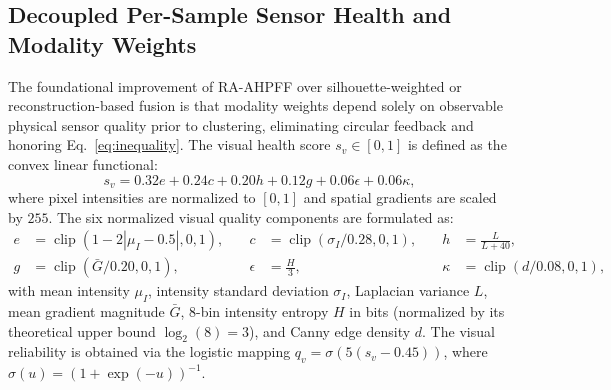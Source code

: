 \documentclass[11pt, a4paper]{article}
\begin{document}
\subsection{Decoupled Per-Sample Sensor Health and Modality Weights}
\label{subsec:weights}
The foundational improvement of RA-AHPFF over silhouette-weighted or reconstruction-based fusion \cite{hu2022view, yang2025deep, he2026adaptive} is that modality weights depend solely on observable physical sensor quality prior to clustering, eliminating circular feedback \cite{kim2022profeat} and honoring Eq.~\eqref{eq:inequality}. The visual health score $s_v \in [0,1]$ is defined as the convex linear functional:
\begin{equation}
s_v = 0.32 e + 0.24 c + 0.20 h + 0.12 g + 0.06 \epsilon + 0.06 \kappa,
\label{eq:sv}
\end{equation}
where pixel intensities are normalized to $[0,1]$ and spatial gradients are scaled by $255$. The six normalized visual quality components are formulated as:
\begin{equation}
\begin{aligned}
e &= \operatorname{clip}(1-2|\mu_I-0.5|,0,1), \quad &
c &= \operatorname{clip}(\sigma_I/0.28,0,1), \quad &
h &= \frac{L}{L+40}, \\
g &= \operatorname{clip}(\bar{G}/0.20,0,1), \quad &
\epsilon &= \frac{H}{3}, \quad &
\kappa &= \operatorname{clip}(d/0.08,0,1),
\end{aligned}
\label{eq:visual_terms}
\end{equation}
with mean intensity $\mu_I$, intensity standard deviation $\sigma_I$, Laplacian variance $L$, mean gradient magnitude $\bar{G}$, 8-bin intensity entropy $H$ in bits (normalized by its theoretical upper bound $\log_2(8)=3$), and Canny edge density $d$. The visual reliability is obtained via the logistic mapping $q_v=\sigma(5(s_v-0.45))$, where $\sigma(u) = (1+\exp(-u))^{-1}$.
\end{document}
